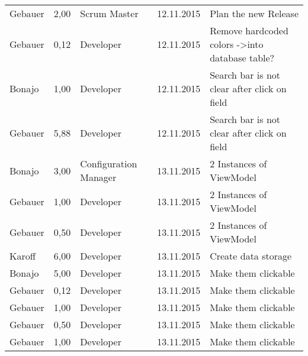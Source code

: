 \begin{longtable}{ l r p{2cm} c p{4cm} }
		Gebauer                 & 2,00           & Scrum Master          & 12.11.2015    & Plan the new Release                                                            \\
		Gebauer                 & 0,12           & Developer             & 12.11.2015    & Remove hardcoded colors -\textgreater into database table?                      \\
		Bonajo                  & 1,00           & Developer             & 12.11.2015    & Search bar is not clear after click on field                                    \\
		Gebauer                 & 5,88           & Developer             & 12.11.2015    & Search bar is not clear after click on field                                    \\
		Bonajo                  & 3,00           & Configuration Manager & 13.11.2015    & 2 Instances of ViewModel                                                        \\
		Gebauer                 & 1,00           & Developer             & 13.11.2015    & 2 Instances of ViewModel                                                        \\
		Gebauer                 & 0,50           & Developer             & 13.11.2015    & 2 Instances of ViewModel                                                        \\
		Karoff                  & 6,00           & Developer             & 13.11.2015    & Create data storage                                                             \\
		Bonajo                  & 5,00           & Developer             & 13.11.2015    & Make them clickable                                                             \\
		Gebauer                 & 0,12           & Developer             & 13.11.2015    & Make them clickable                                                             \\
		Gebauer                 & 1,00           & Developer             & 13.11.2015    & Make them clickable                                                             \\
		Gebauer                 & 0,50           & Developer             & 13.11.2015    & Make them clickable                                                             \\
		Gebauer                 & 1,00           & Developer             & 13.11.2015    & Make them clickable                                                             \\

\end{longtable}
